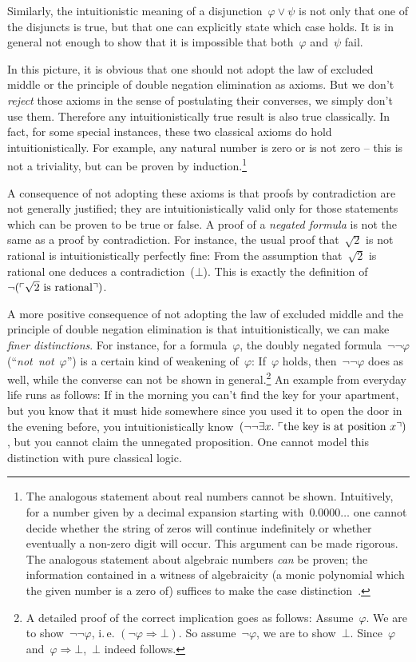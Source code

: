 \documentclass[10pt,reqno,a4paper]{amsbook}
\makeatletter
\theoremstyle{definition}
\theoremstyle{plain}
\theoremstyle{remark}
\newcommand{\?}{\,{:}\,}
\renewcommand{\_}{\mathpunct{.}\,}
\newcommand{\speak}[1]{\ulcorner\text{\textnormal{#1}}\urcorner}
\newcommand{\ie}{i.\,e.\@\xspace}
\newcommand{\notnot}{\emph{not~not}\xspace}
\makeatother
\begin{document}
Similarly, the intuitionistic meaning of a disjunction~$\varphi \vee \psi$ is
not only that one of the disjuncts is true, but that one can explicitly state
which case holds. It is in general not enough to show that it is impossible
that both~$\varphi$ and~$\psi$ fail.

In this picture, it is obvious that one should not adopt the law of excluded
middle or the principle of double negation elimination as axioms. But we
don't \emph{reject} those axioms in the sense of postulating their
converses, we simply don't use them. Therefore any intuitionistically
true result is also true classically. In fact, for some special instances,
these two classical axioms do hold intuitionistically. For example, any natural
number is zero or is not zero -- this is not a triviality, but can be proven by
induction.\footnote{The analogous statement about real numbers cannot be
shown. Intuitively, for a number given by a decimal expansion starting
with~$0.0000\ldots$ one cannot decide whether the string of zeros will continue
indefinitely or whether eventually a non-zero digit will occur. This argument
can be made rigorous. The analogous statement about algebraic numbers
\emph{can} be proven; the information contained in a witness of algebraicity (a
monic polynomial which the given number is a zero of) suffices to make the
case distinction~\cite[Chapter~VI.1, p.~140]{mines-richman-ruitenburg:constructive-algebra}.}

A consequence of not adopting these axioms is that proofs by contradiction are
not generally justified; they are intuitionistically valid only for those
statements which can be proven to be true or false. A proof of a
\emph{negated formula} is not the same as a proof by contradiction. For
instance, the usual proof that~$\sqrt{2}$ is not rational is
intuitionistically perfectly fine: From the assumption that~$\sqrt{2}$ is
rational one deduces a contradiction~($\bot$). This is exactly the definition
of~$\neg(\speak{$\sqrt{2}$ is rational})$.

A more positive consequence of not adopting the law of excluded middle and the
principle of double negation elimination is that intuitionistically, we can
make \emph{finer distinctions}. For instance, for a formula~$\varphi$, the doubly
negated formula~$\neg\neg\varphi$ (``\notnot~$\varphi$'') is a certain kind of weakening of~$\varphi$:
If~$\varphi$ holds, then~$\neg\neg\varphi$ does as well, while the converse can
not be shown in general.\footnote{A detailed proof of the correct implication
goes as follows: Assume~$\varphi$. We are to show~$\neg\neg\varphi$, \ie
$(\neg\varphi \Rightarrow \bot)$. So assume~$\neg\varphi$, we are to
show~$\bot$. Since~$\varphi$ and~$\varphi \Rightarrow \bot$,~$\bot$ indeed
follows.} An example from everyday life runs as follows: If in the morning you
can't find the key for your apartment, but you know that it must hide
somewhere since you used it to open the door in the evening before, you
intuitionistically know~$(\neg\neg\exists x\_ \speak{the key is at position
$x$})$, but you cannot claim the unnegated proposition. One cannot model this
distinction with pure classical logic.
\end{document}
